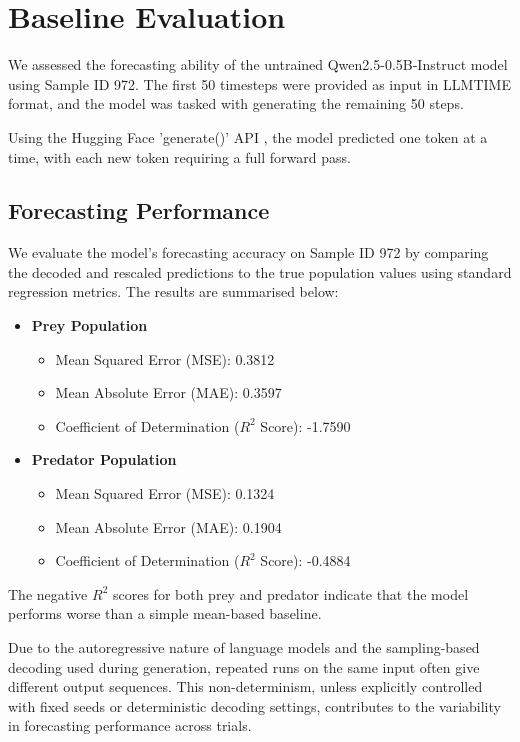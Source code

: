\documentclass[a4paper,12pt]{article}
\begin{document}
  
\section{Baseline Evaluation}

We assessed the forecasting ability of the untrained Qwen2.5-0.5B-Instruct model \cite{qwen2.5} using Sample ID 972. The first 50 timesteps were provided as input in LLMTIME format, and the model was tasked with generating the remaining 50 steps.

Using the Hugging Face 'generate()' API \cite{huggingface}, the model predicted one token at a time, with each new token requiring a full forward pass.

\subsection*{Forecasting Performance}

We evaluate the model's forecasting accuracy on Sample ID 972 by comparing the decoded and rescaled predictions to the true population values using standard regression metrics. The results are summarised below:

\begin{itemize}
  \item \textbf{Prey Population}
  \begin{itemize}
    \item Mean Squared Error (MSE): 0.3812
    \item Mean Absolute Error (MAE): 0.3597
    \item Coefficient of Determination ($R^2$ Score): -1.7590
  \end{itemize}

  \item \textbf{Predator Population}
  \begin{itemize}
    \item Mean Squared Error (MSE): 0.1324
    \item Mean Absolute Error (MAE): 0.1904
    \item Coefficient of Determination ($R^2$ Score): -0.4884
  \end{itemize}
\end{itemize}

The negative $R^2$ scores for both prey and predator indicate that the model performs worse than a simple mean-based baseline.

  Due to the autoregressive nature of language models and the sampling-based decoding used during generation, repeated runs on the same input often give different output sequences. This non-determinism, unless explicitly controlled with fixed seeds or deterministic decoding settings, contributes to the variability in forecasting performance across trials.
  
\end{document}
